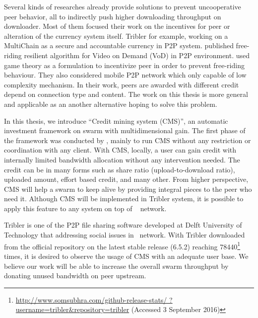 Several kinds of researches already provide solutions to prevent uncooperative peer behavior, all to indirectly push higher downloading throughput on downloader. Most of them focused their work on the incentives for peer or alteration of the currency system itself. Tribler for example, working on a MultiChain \cite{2015:multichain:norberhuis} as a secure and accountable currency in P2P system. \citeauthor{2008:givetogetvod:Mol} published free-riding resilient algorithm for Video on Demand (VoD) in P2P environment\cite{2008:givetogetvod:Mol}. \citeauthor{2015:incentivep2pgame:kang} used game theory as a formulation to incentivize peer in order to prevent free-riding behaviour\cite{2015:incentivep2pgame:kang}. They also considered mobile P2P network which only capable of low complexity mechanism. In their work, peers are awarded with different credit depend on connection type and content. The work on this thesis is more general and applicable as an another alternative hoping to solve this problem. 

In this thesis, we introduce ``Credit mining system (CMS)'', an automatic investment framework on swarm with multidimensional gain. The first phase of the framework was conducted by \citeauthor{2015:creditmining:capota}, mainly to run CMS without any restriction or coordination with any client. With CMS, locally, a user can gain credit with internally limited bandwidth allocation without any intervention needed. The credit can be in many forms such as share ratio (upload-to-download ratio), uploaded amount, effort based credit, and many other. From higher perspective, CMS will help a swarm to keep alive by providing integral pieces to the peer who need it. Although CMS will be implemented in Tribler system, it is possible to apply this feature to any system on top of \bt~ network.

Tribler is one of the P2P file sharing software developed at Delft University of Technology that addressing social issues in \bt~network\cite{2008:tribler:pouwelse}. With Tribler downloaded from the official repository on the latest stable release (6.5.2) reaching  78440\footnote{\url{http://www.somsubhra.com/github-release-stats/ ?username=tribler&repository=tribler} (Accessed 3 September 2016)} times, it is desired to observe the usage of CMS with an adequate user base. We believe our work will be able to increase the overall swarm throughput by donating unused bandwidth on peer upstream.


